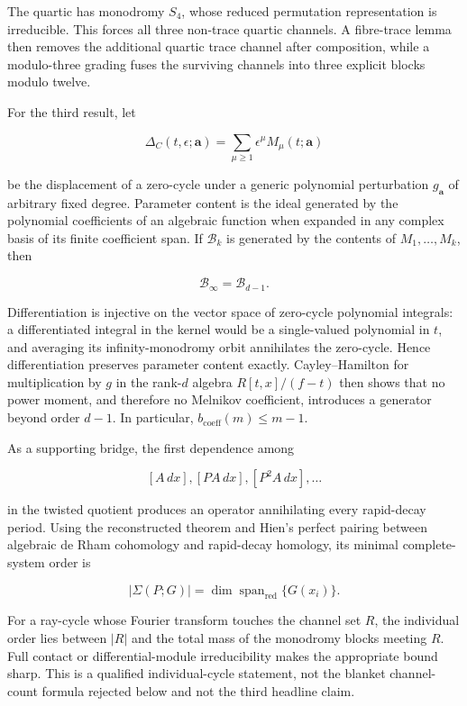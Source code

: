 \documentclass[
  11pt,
  a4paper,
]{amsart}
\begin{document}
The quartic has monodromy \(S_4\), whose reduced permutation
representation is irreducible. This forces all three non-trace quartic
channels. A fibre-trace lemma then removes the additional quartic trace
channel after composition, while a modulo-three grading fuses the
surviving channels into three explicit blocks modulo twelve.

For the third result, let

\[
\Delta_C(t,\epsilon;\boldsymbol a)
=\sum_{\mu\ge1}\epsilon^\mu M_\mu(t;\boldsymbol a)
\]

be the displacement of a zero-cycle under a generic polynomial
perturbation \(g_{\boldsymbol a}\) of arbitrary fixed degree. Parameter
content is the ideal generated by the polynomial coefficients of an
algebraic function when expanded in any complex basis of its finite
coefficient span. If \(\mathcal B_k\) is generated by the contents of
\(M_1,\ldots,M_k\), then

\[
\mathcal B_\infty=\mathcal B_{d-1}.
\]

Differentiation is injective on the vector space of zero-cycle
polynomial integrals: a differentiated integral in the kernel would be a
single-valued polynomial in \(t\), and averaging its infinity-monodromy
orbit annihilates the zero-cycle. Hence differentiation preserves
parameter content exactly. Cayley--Hamilton for multiplication by \(g\)
in the rank-\(d\) algebra \(R[t,x]/(f-t)\) then shows that no power
moment, and therefore no Melnikov coefficient, introduces a generator
beyond order \(d-1\). In particular, \(b_{\mathrm{coeff}}(m)\le m-1\).

As a supporting bridge, the first dependence among

\[
[A\,dx],[PA\,dx],[P^2A\,dx],\ldots
\]

in the twisted quotient produces an operator annihilating every
rapid-decay period. Using the reconstructed theorem and Hien's perfect
pairing between algebraic de Rham cohomology and rapid-decay homology,
its minimal complete-system order is

\[
|\Sigma(P;G)|
=\dim\operatorname{span}_{\mathrm{red}}\{G(x_i)\}.
\]

For a ray-cycle whose Fourier transform touches the channel set \(R\),
the individual order lies between \(|R|\) and the total mass of the
monodromy blocks meeting \(R\). Full contact or differential-module
irreducibility makes the appropriate bound sharp. This is a qualified
individual-cycle statement, not the blanket channel-count formula
rejected below and not the third headline claim.
\end{document}
